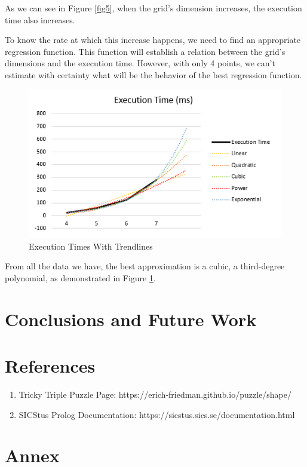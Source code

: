 \documentclass[runningheads]{llncs}
\begin{document}
As we can see in Figure \ref{fig5}, when the grid's dimension increases,
    the execution time also increases.

To know the rate at which this increase happens, we need to find an appropriate regression function.
This function will establish a relation between the grid's dimensions and the execution time.
However, with only 4 points, we can't estimate with certainty what will be the behavior
    of the best regression function.

\begin{figure} [h]
    \centering
    \includegraphics[scale=0.6]{img/dimensional_prediction.png}
    \caption{Execution Times With Trendlines} \label{fig6}
\end{figure}

From all the data we have, the best approximation is a cubic, a third-degree polynomial,
    as demonstrated in Figure \ref{fig6}.

\section{Conclusions and Future Work}

\section{References}
\begin{enumerate}
    \item Tricky Triple Puzzle Page: https://erich-friedman.github.io/puzzle/shape/
    \item SICStus Prolog Documentation: https://sicstus.sics.se/documentation.html
\end{enumerate}

\newpage
\section{Annex}
\end{document}
